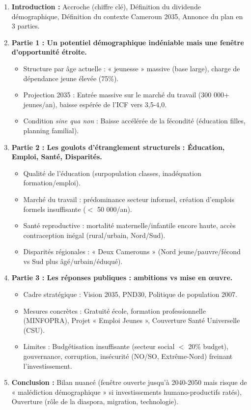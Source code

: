 \documentclass[11pt]{article}
\begin{document}
\begin{exercice}
\begin{enumerate}
    \item \textbf{Introduction :} Accroche (chiffre clé), Définition du dividende démographique, Définition du contexte Cameroun 2035, Annonce du plan en 3 parties.
    \item \textbf{Partie 1 : Un potentiel démographique indéniable mais une fenêtre d'opportunité étroite.}
    \begin{itemize}
        \item Structure par âge actuelle : « jeunesse » massive (base large), charge de dépendance jeune élevée (75\%).
        \item Projection 2035 : Entrée massive sur le marché du travail (300 000+ jeunes/an), baisse espérée de l'ICF vers 3,5-4,0.
        \item Condition \textit{sine qua non} : Baisse accélérée de la fécondité (éducation filles, planning familial).
    \end{itemize}
    \item \textbf{Partie 2 : Les goulots d'étranglement structurels : Éducation, Emploi, Santé, Disparités.}
    \begin{itemize}
        \item Qualité de l'éducation (surpopulation classes, inadéquation formation/emploi).
        \item Marché du travail : prédominance secteur informel, création d'emplois formels insuffisante ($<$ 50 000/an).
        \item Santé reproductive : mortalité maternelle/infantile encore haute, accès contraception inégal (rural/urbain, Nord/Sud).
        \item Disparités régionales : « Deux Camerouns » (Nord jeune/pauvre/fécond vs Sud plus âgé/urbain/éduqué).
    \end{itemize}
    \item \textbf{Partie 3 : Les réponses publiques : ambitions vs mise en œuvre.}
    \begin{itemize}
        \item Cadre stratégique : Vision 2035, PND30, Politique de population 2007.
        \item Mesures concrètes : Gratuité école, formation professionnelle (MINFOPRA), Projet « Emploi Jeunes », Couverture Santé Universelle (CSU).
        \item Limites : Budgétisation insuffisante (secteur social $<$ 20\% budget), gouvernance, corruption, insécurité (NO/SO, Extrême-Nord) freinant l'investissement.
    \end{itemize}
    \item \textbf{Conclusion :} Bilan nuancé (fenêtre ouverte jusqu'à 2040-2050 mais risque de « malédiction démographique » si investissements humano-productifs ratés), Ouverture (rôle de la diaspora, migration, technologie).
\end{enumerate}
\end{exercice}
\end{document}

